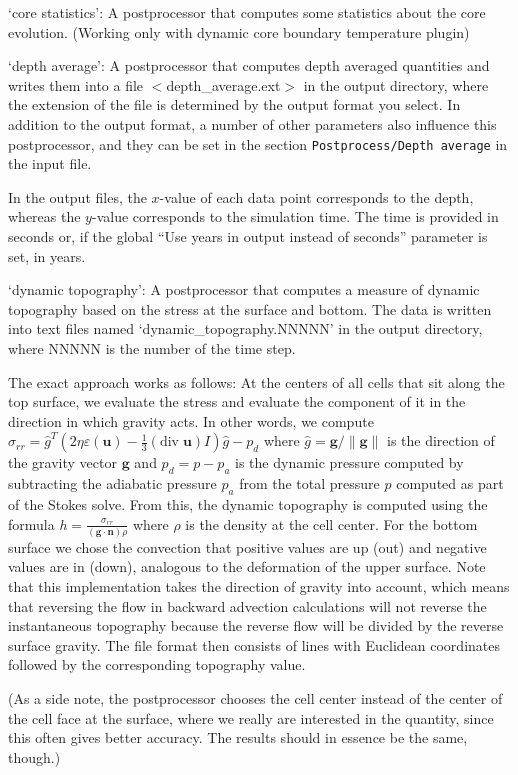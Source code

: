 \begin{itemize}
`core statistics': A postprocessor that computes some statistics about the core evolution. (Working only with dynamic core boundary temperature plugin)

`depth average': A postprocessor that computes depth averaged quantities and writes them into a file $<$depth\_average.ext$>$ in the output directory, where the extension of the file is determined by the output format you select. In addition to the output format, a number of other parameters also influence this postprocessor, and they can be set in the section \texttt{Postprocess/Depth average} in the input file.

In the output files, the $x$-value of each data point corresponds to the depth, whereas the $y$-value corresponds to the simulation time. The time is provided in seconds or, if the global ``Use years in output instead of seconds'' parameter is set, in years.

`dynamic topography': A postprocessor that computes a measure of dynamic topography based on the stress at the surface and bottom. The data is written into text files named `dynamic\_topography.NNNNN' in the output directory, where NNNNN is the number of the time step.

The exact approach works as follows: At the centers of all cells that sit along the top surface, we evaluate the stress and evaluate the component of it in the direction in which gravity acts. In other words, we compute $\sigma_{rr}={\hat g}^T(2 \eta \varepsilon(\mathbf u)- \frac 13 (\textrm{div}\;\mathbf u)I)\hat g - p_d$ where $\hat g = \mathbf g/\|\mathbf g\|$ is the direction of the gravity vector $\mathbf g$ and $p_d=p-p_a$ is the dynamic pressure computed by subtracting the adiabatic pressure $p_a$ from the total pressure $p$ computed as part of the Stokes solve. From this, the dynamic topography is computed using the formula $h=\frac{\sigma_{rr}}{(\mathbf g \cdot \mathbf n)  \rho}$ where $\rho$ is the density at the cell center. For the bottom surface we chose the convection that positive values are up (out) and negative values are in (down), analogous to the deformation of the upper surface. Note that this implementation takes the direction of gravity into account, which means that reversing the flow in backward advection calculations will not reverse the instantaneous topography because the reverse flow will be divided by the reverse surface gravity.  
The file format then consists of lines with Euclidean coordinates followed by the corresponding topography value.

(As a side note, the postprocessor chooses the cell center instead of the center of the cell face at the surface, where we really are interested in the quantity, since this often gives better accuracy. The results should in essence be the same, though.)


\end{itemize}
